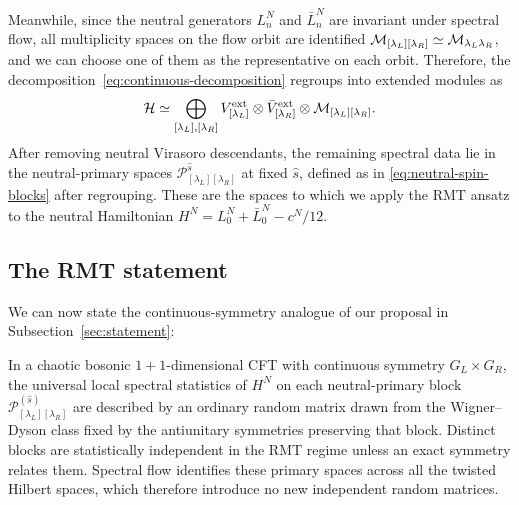\documentclass[11pt]{article}
\numberwithin{equation}{section}
\begin{document}
Meanwhile, since the neutral generators $L_n^N$ and $\bar{L}_n^N$ are invariant under spectral flow, all multiplicity spaces on the flow orbit are identified $\mathcal{M}_{[\lambda_L][\lambda_R]}\simeq\mathcal{M}_{\lambda_L\lambda_R}$, and we can choose one of them as the representative on each orbit. Therefore, the decomposition~\eqref{eq:continuous-decomposition} regroups into extended modules as
\begin{equation}
\mathcal H\simeq\bigoplus_{[\lambda_L],[\lambda_R]}
 V^{\rm ext}_{[\lambda_L]}\otimes
 \bar V^{\rm ext}_{[\lambda_R]}\otimes
 \mathcal{M}_{[\lambda_L][\lambda_R]}.
\label{eq:extended-decomposition}
\end{equation}
After removing neutral Virasoro descendants, the remaining spectral data lie in the neutral-primary spaces $\mathcal P_{[\lambda_L][\lambda_R]}^{\hat{s}}$ at fixed $\hat s$, defined as in \eqref{eq:neutral-spin-blocks} after regrouping.  These are the spaces to which we apply the RMT ansatz to the neutral Hamiltonian  $H^N=L_0^N+\bar L_0^N-c^N/12$.

\subsection{The RMT statement}
\label{sec:continuous-RMT-statement}
We can now state the continuous-symmetry analogue of our proposal in Subsection~\ref{sec:statement}:
\begin{tcolorbox}[
  colback=gray!10,
  colframe=blue,
  boxrule=0.6pt,
  arc=2pt,
  left=6pt,
  right=6pt,
  top=4pt,
  bottom=4pt]
In a chaotic bosonic $1+1$-dimensional CFT with continuous symmetry $G_L\times G_R$, the universal local spectral statistics of $H^N$ on each neutral-primary block $\mathcal P^{(\hat s)}_{[\lambda_L][\lambda_R]}$ are described by an ordinary random matrix drawn from the Wigner--Dyson class fixed by the antiunitary symmetries preserving that block. Distinct blocks are statistically independent in the RMT regime unless an exact symmetry relates them. Spectral flow identifies these primary spaces across all the twisted Hilbert spaces, which therefore introduce no new independent random matrices.
\end{tcolorbox}
\end{document}
